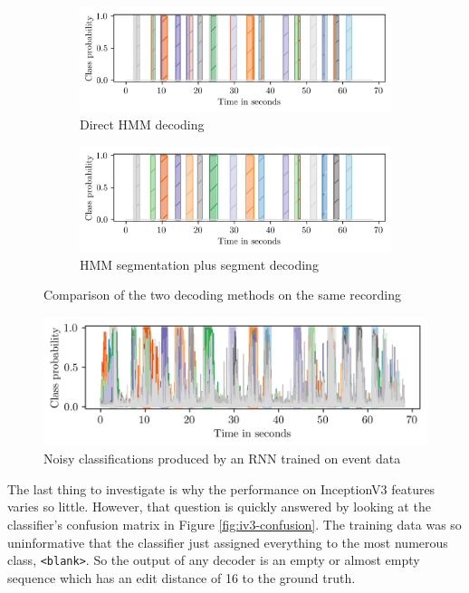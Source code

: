 \begin{figure}[h]
  \centering
  \begin{subfigure}{\textwidth}
    \centering
    \includegraphics{figures/results/decoded/decoded}
    \caption{Direct HMM decoding}
  \end{subfigure}
  \begin{subfigure}{\textwidth}
    \centering
    \includegraphics{figures/results/decoded/segmented}
    \caption{HMM segmentation plus segment decoding}
  \end{subfigure}
  \caption{Comparison of the two decoding methods on the same recording}
  \label{fig:decoded}
\end{figure}

\begin{figure}[h]
  \centering
  \includegraphics[width=6in]{figures/results/event-classifications.png}
  \caption{Noisy classifications produced by an RNN trained on event data}
  \label{fig:event-cls}
\end{figure}

The last thing to investigate is why the performance on InceptionV3 features
varies so little. However, that question is quickly answered by looking at the
classifier's confusion matrix in Figure \ref{fig:iv3-confusion}. The training
data was so uninformative that the classifier just assigned everything to the
most numerous class, \texttt{<blank>}. So the output of any decoder is an empty
or almost empty sequence which has an edit distance of 16 to the ground truth.

